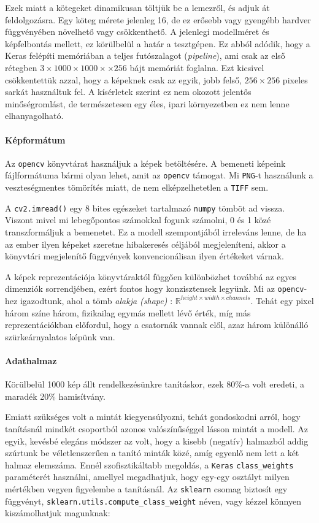 Ezek miatt a kötegeket dinamikusan töltjük be a lemezről, és adjuk át feldolgozásra.
Egy köteg mérete jelenleg 16, de ez erősebb vagy gyengébb hardver függvényében 
növelhető vagy csökkenthető. A jelenlegi modellméret és képfelbontás mellett, ez 
körülbelül a határ a tesztgépen. Ez abból adódik, hogy a Keras felépíti memóriában 
a teljes futószalagot (\textit{pipeline}), ami csak az első rétegben
$ 3 \times 1000 \times 1000 \times \times 256 $ bájt memóriát foglalna.
Ezt kicsivel csökkentettük azzal, hogy a képeknek csak az egyik, jobb felső,
$ 256 \times 256 $ pixeles sarkát használtuk fel. A kísérletek szerint ez nem okozott
jelentős minőségromlást, de természetesen egy éles, ipari környezetben ez nem lenne
elhanyagolható.


\paragraph{Képformátum}
Az \texttt{opencv} könyvtárat használjuk a képek betöltésére.
A bemeneti képeink fájlformátuma bármi olyan lehet, amit az \texttt{opencv} támogat.
Mi \texttt{PNG}-t használunk a veszteségmentes tömörítés miatt, de nem elképzelhetetlen
a \texttt{TIFF} sem.


A \texttt{cv2.imread()} egy 8 bites egészeket
tartalmazó \texttt{numpy} tömböt ad vissza. Viszont mivel mi lebegőpontos számokkal fogunk számolni,
0 és 1 közé transzformáljuk a bemenetet. Ez a modell szempontjából irreleváns lenne,
de ha az ember ilyen képeket szeretne hibakeresés céljából megjeleníteni, akkor a
könyvtári megjelenítő függvények konvencionálisan ilyen értékeket várnak.


A képek reprezentációja könyvtáraktól függően különbözhet továbbá az egyes dimenziók 
sorrendjében, ezért fontos hogy konzisztensek legyünk. Mi az \texttt{opencv}-hez
igazodtunk, ahol a tömb \textit{alakja (shape)} : 
$ \mathbb{R}^{height \times width \times channels } $. 
Tehát egy pixel három színe három, fizikailag egymás mellett lévő érték,
míg más reprezentációkban előfordul, hogy a csatornák vannak elől, azaz három különálló
szürkeárnyalatos képünk van.


\paragraph{Adathalmaz}

Körülbelül 1000 kép állt rendelkezésünkre tanításkor, ezek 80\%-a volt
eredeti, a maradék 20\% hamisítvány. 


Emiatt szükséges volt a mintát kiegyensúlyozni, tehát gondoskodni arról,
hogy tanításnál mindkét csoportból azonos valószínűséggel lásson mintát 
a modell. Az egyik, kevésbé elegáns módszer az volt, hogy a kisebb (negatív) 
halmazból addig szúrtunk be véletlenszerűen a tanító minták közé, 
amíg egyenlő nem lett a két halmaz elemszáma.
Ennél szofisztikáltabb megoldás, a \texttt{Keras} \texttt{class\_weights} paraméterét
használni, amellyel megadhatjuk, hogy egy-egy osztályt milyen mértékben vegyen 
figyelembe a tanításnál. Az \texttt{sklearn} csomag biztosít egy függvényt,
\texttt{sklearn.utils.compute\_class\_weight} néven, vagy kézzel könnyen kiszámolhatjuk 
magunknak:

